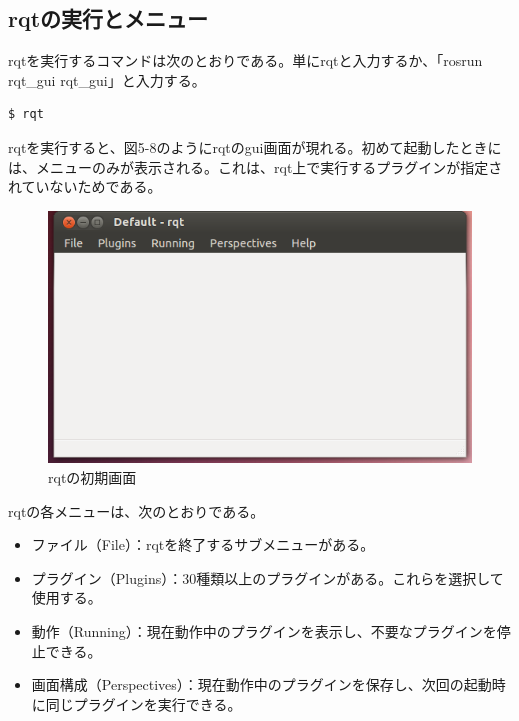 \subsection{rqtの実行とメニュー}

rqtを実行するコマンドは次のとおりである。単にrqtと入力するか、「rosrun rqt\_gui rqt\_gui」と入力する。

\begin{lstlisting}[language=ROS]
$ rqt
\end{lstlisting}

rqtを実行すると、図5-8のようにrqtのgui画面が現れる。初めて起動したときには、メニューのみが表示される。これは、rqt上で実行するプラグインが指定されていないためである。

\begin{figure}[h]
  \centering
  \includegraphics[width=\columnwidth]{pictures/chapter5/pic_05_08.png}
  \caption{rqtの初期画面}
\end{figure}

rqtの各メニューは、次のとおりである。

\begin{itemize}
\item ファイル（File）：rqtを終了するサブメニューがある。
\item プラグイン（Plugins）：30種類以上のプラグインがある。これらを選択して使用する。
\item 動作（Running）：現在動作中のプラグインを表示し、不要なプラグインを停止できる。
\item 画面構成（Perspectives）：現在動作中のプラグインを保存し、次回の起動時に同じプラグインを実行できる。
\end{itemize}

